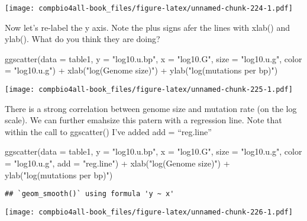 \documentclass[
]{book}
\newenvironment{Shaded}{\begin{snugshade}}{\end{snugshade}}
\newcommand{\AttributeTok}[1]{\textcolor[rgb]{0.77,0.63,0.00}{#1}}
\newcommand{\FunctionTok}[1]{\textcolor[rgb]{0.00,0.00,0.00}{#1}}
\newcommand{\NormalTok}[1]{#1}
\newcommand{\SpecialCharTok}[1]{\textcolor[rgb]{0.00,0.00,0.00}{#1}}
\newcommand{\StringTok}[1]{\textcolor[rgb]{0.31,0.60,0.02}{#1}}
\begin{document}
\texttt{[image: compbio4all-book\_files/figure-latex/unnamed-chunk-224-1.pdf]}

Now let's re-label the y axis. Note the plus signs afer the lines with xlab() and ylab(). What do you think they are doing?

\begin{Shaded}
\begin{Highlighting}[]
\FunctionTok{ggscatter}\NormalTok{(}\AttributeTok{data =}\NormalTok{ table1,}
          \AttributeTok{y =} \StringTok{"log10.u.bp"}\NormalTok{,}
          \AttributeTok{x =} \StringTok{"log10.G"}\NormalTok{,}
          \AttributeTok{size =} \StringTok{"log10.u.g"}\NormalTok{,   }
          \AttributeTok{color =} \StringTok{"log10.u.g"}\NormalTok{) }\SpecialCharTok{+}
  \FunctionTok{xlab}\NormalTok{(}\StringTok{"log(Genome size)"}\NormalTok{)     }\SpecialCharTok{+}
  \FunctionTok{ylab}\NormalTok{(}\StringTok{"log(mutations per bp)"}\NormalTok{)}
\end{Highlighting}
\end{Shaded}

\texttt{[image: compbio4all-book\_files/figure-latex/unnamed-chunk-225-1.pdf]}

There is a strong correlation between genome size and mutation rate (on the log scale). We can further emahsize this patern with a regression line. Note that within the call to ggscatter() I've added add = ``reg.line''

\begin{Shaded}
\begin{Highlighting}[]
\FunctionTok{ggscatter}\NormalTok{(}\AttributeTok{data =}\NormalTok{ table1,}
          \AttributeTok{y =} \StringTok{"log10.u.bp"}\NormalTok{,}
          \AttributeTok{x =} \StringTok{"log10.G"}\NormalTok{,}
          \AttributeTok{size =} \StringTok{"log10.u.g"}\NormalTok{,   }
          \AttributeTok{color =} \StringTok{"log10.u.g"}\NormalTok{,}
          \AttributeTok{add =} \StringTok{"reg.line"}\NormalTok{) }\SpecialCharTok{+}
  \FunctionTok{xlab}\NormalTok{(}\StringTok{"log(Genome size)"}\NormalTok{)     }\SpecialCharTok{+}
  \FunctionTok{ylab}\NormalTok{(}\StringTok{"log(mutations per bp)"}\NormalTok{)}
\end{Highlighting}
\end{Shaded}

\begin{verbatim}
## `geom_smooth()` using formula 'y ~ x'
\end{verbatim}

\texttt{[image: compbio4all-book\_files/figure-latex/unnamed-chunk-226-1.pdf]}
\end{document}
